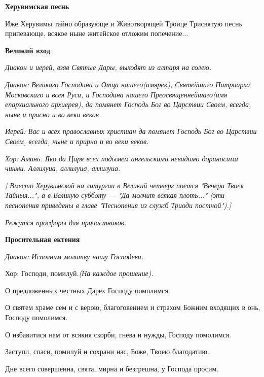 \medskip


 \bfseries Херувимская песнь \normalfont{}


  Иже Херувимы тайно образующе и Животворящей Троице Трисвятую песнь припевающе, всякое ныне житейское отложим попечение... 


\medskip


\bfseries  Великий вход \normalfont{}


\itshape  Диакон и иерей, взяв Святые Дары, выходят из алтаря на солею.\normalfont{}


\itshape  Диакон:\normalfont{} Великаго Господина и Отца нашего\itshape  (имярек),\normalfont{} Святейшаго Патриарха Московскаго и всея Руси, и Господина нашего Преосвященнейшаго\itshape  (имя епархиального архиерея),\normalfont{} да помянет Господь Бог во Царствии Своем, всегда, ныне и присно и во веки веков.


\itshape  Иерей:\normalfont{} Вас и всех православных христиан да помянет Господь Бог во Царствии Своем, всегда, ныне и прирно и во веки веков.


\itshape Хор:\normalfont{} Аминь. Яко да Царя всех подымем ангельскими невидимо дориносима чинми. Аллилуиа, аллилуиа, аллилуиа.


 \itshape  [ Вместо Херувимской на литургии в Великий четверг поется \normalfont{}"Вечери Твоея Тайныя..\itshape .", а в Великую субботу — \normalfont{}"Да молчит всякая плоть..\itshape ." (эти песнопения приведены в главе "Песнопения из служб Триоди постной").]\normalfont{}



\itshape  Режутся просфоры для причастников\normalfont{}. 


\medskip


 \bfseries Просительная ектения \normalfont{}


\itshape  Диакон:\normalfont{} Исполним молитву нашу Господеви. \itshape 


  Хор:\normalfont{} Господи, помилуй.\itshape  (На каждое прошение\normalfont{}). 


  О предложенных честных Дарех Господу помолимся. 


  О святем храме сем и с верою, благоговением и страхом Божиим входящих в онь, Господу помолимся. 


  О избавитися нам от всякия скорби, гнева и нужды, Господу помолимся. 


  Заступи, спаси, помилуй и сохрани нас, Боже, Твоею благодатию. 


  Дне всего совершенна, свята, мирна и безгрешна, у Господа просим. \itshape 


